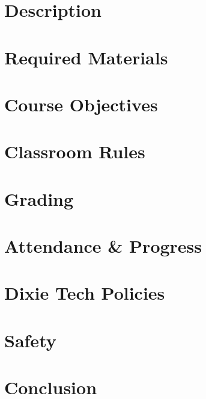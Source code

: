 \documentclass{article}
\begin{document}

\section*{Description}
\bline


\section*{Required Materials}


\section*{Course Objectives}


\section*{Classroom Rules}


\section*{Grading}
\bline


\section*{Attendance \& Progress}
\bline


\section*{Dixie Tech Policies}
\bline


\section*{Safety}
\bline


\section*{Conclusion}
\bline

\end{document}
